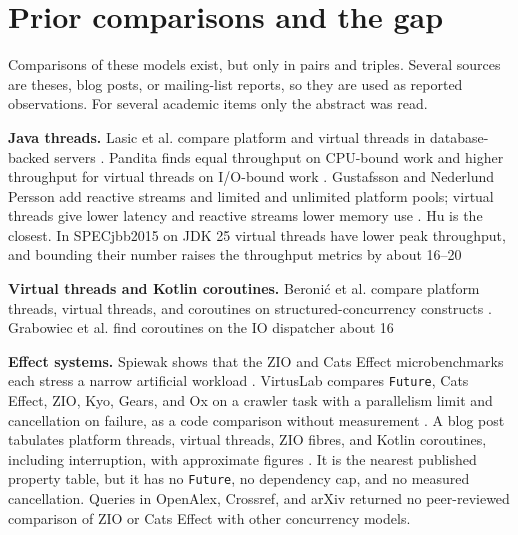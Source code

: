 \section{Prior comparisons and the gap}

Comparisons of these models exist, but only in pairs and triples. Several sources are theses, blog posts, or mailing-list reports, so they are used as reported observations. For several academic items only the abstract was read.

\textbf{Java threads.} Lasic et al. compare platform and virtual threads in database-backed servers \cite{ref18}. Pandita finds equal throughput on CPU-bound work and higher throughput for virtual threads on I/O-bound work \cite{ref19}. Gustafsson and Nederlund Persson add reactive streams and limited and unlimited platform pools; virtual threads give lower latency and reactive streams lower memory use \cite{ref20}. Hu is the closest. In SPECjbb2015 on JDK 25 virtual threads have lower peak throughput, and bounding their number raises the throughput metrics by about 16--20%

\textbf{Virtual threads and Kotlin coroutines.} Beronić et al. compare platform threads, virtual threads, and coroutines on structured-concurrency constructs \cite{ref22}. Grabowiec et al. find coroutines on the IO dispatcher about 16%

\textbf{Effect systems.} Spiewak shows that the ZIO and Cats Effect microbenchmarks each stress a narrow artificial workload \cite{ref25}. VirtusLab compares \texttt{Future}, Cats Effect, ZIO, Kyo, Gears, and Ox on a crawler task with a parallelism limit and cancellation on failure, as a code comparison without measurement \cite{ref26}. A blog post tabulates platform threads, virtual threads, ZIO fibres, and Kotlin coroutines, including interruption, with approximate figures \cite{ref27}. It is the nearest published property table, but it has no \texttt{Future}, no dependency cap, and no measured cancellation. Queries in OpenAlex, Crossref, and arXiv returned no peer-reviewed comparison of ZIO or Cats Effect with other concurrency models.

